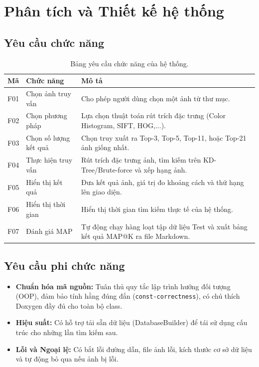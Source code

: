 \chapter{Phân tích và Thiết kế hệ thống}

\section{Yêu cầu chức năng}

\begin{table}[H]
\centering
\begin{tabularx}{\textwidth}{|c|X|X|}
\hline
\textbf{Mã} & \textbf{Chức năng} & \textbf{Mô tả} \\
\hline
F01 & Chọn ảnh truy vấn & Cho phép người dùng chọn một ảnh từ thư mục. \\
\hline
F02 & Chọn phương pháp & Lựa chọn thuật toán rút trích đặc trưng (Color Histogram, SIFT, HOG,...). \\
\hline
F03 & Chọn số lượng kết quả & Chọn truy xuất ra Top-3, Top-5, Top-11, hoặc Top-21 ảnh giống nhất. \\
\hline
F04 & Thực hiện truy vấn & Rút trích đặc trưng ảnh, tìm kiếm trên KD-Tree/Brute-force và xếp hạng ảnh. \\
\hline
F05 & Hiển thị kết quả & Đưa kết quả ảnh, giá trị đo khoảng cách và thứ hạng lên giao diện. \\
\hline
F06 & Hiển thị thời gian & Hiển thị thời gian tìm kiếm thực tế của hệ thống. \\
\hline
F07 & Đánh giá MAP & Tự động chạy hàng loạt tập dữ liệu Test và xuất bảng kết quả MAP@K ra file Markdown. \\
\hline
\end{tabularx}
\caption{Bảng yêu cầu chức năng của hệ thống.}
\end{table}

\section{Yêu cầu phi chức năng}
\begin{itemize}
    \item \textbf{Chuẩn hóa mã nguồn:} Tuân thủ quy tắc lập trình hướng đối tượng (OOP), đảm bảo tính hằng đúng đắn (\texttt{const-correctness}), có chú thích Doxygen đầy đủ cho toàn bộ class.
    \item \textbf{Hiệu suất:} Có hỗ trợ tải sẵn dữ liệu (DatabaseBuilder) để tái sử dụng cấu trúc cho những lần tìm kiếm sau.
    \item \textbf{Lỗi và Ngoại lệ:} Có bắt lỗi đường dẫn, file ảnh lỗi, kích thước cơ sở dữ liệu và tự động bỏ qua nếu ảnh bị lỗi.
\end{itemize}

